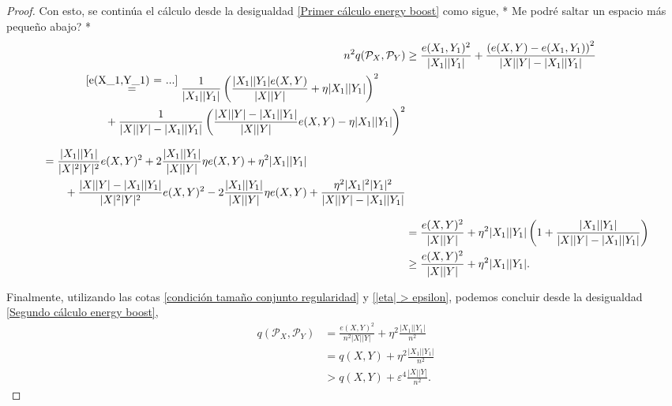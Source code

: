 \documentclass{article}[14pts]
\newcommand{\hh}[1]{{\color{red} * #1 *}}
\let\varepsilon=\varepsilon
\begin{document}
\begin{proof}
    Con esto, se continúa el cálculo desde la desigualdad \eqref{Primer cálculo energy boost} como sigue, \hh{Me podré saltar un espacio más pequeño abajo?}
    \begin{align} \label{Segundo cálculo energy boost}
        n^{2}q(\mathcal{P}_{X}, \mathcal{P}_{Y}) &\geq \frac{e(X_1, Y_1)^{2}}{|X_1||Y_1|} + \frac{\left( e(X,Y) - e(X_1, Y_1)\right)^{2}}{|X||Y| - |X_1||Y_1|}\nonumber\\
        \begin{split}
            &\overset{\eqref{e(X_1,Y_1) = ...}}{=} \frac{1}{|X_1||Y_1|}\left( \frac{|X_1||Y_1|e(X,Y)}{|X||Y|} + \eta |X_1||Y_1|\right)^{2} \\
            &\qquad + \frac{1}{|X||Y| - |X_1||Y_1|}\left( \frac{|X||Y| - |X_1||Y_1|}{|X||Y|}e(X,Y) - \eta |X_1||Y_1|\right)^{2}    
        \end{split}\nonumber\\
        \intertext{}
        \begin{split}
            &= \frac{|X_1||Y_1|}{|X|^{2}|Y|^{2}}e(X,Y)^{2} + 2\frac{|X_1||Y_1|}{|X||Y|}\eta e(X,Y) + \eta^{2}|X_1||Y_1| \\
            &\qquad + \frac{|X||Y| - |X_1||Y_1|}{|X|^{2}|Y|^{2}}e(X,Y)^{2} - 2\frac{|X_1||Y_1|}{|X||Y|}\eta e(X,Y) + \frac{\eta^{2} |X_1|^{2}|Y_1|^{2}}{|X||Y| - |X_1||Y_1|}    
        \end{split}\nonumber\\
        \intertext{ }
        &= \frac{e(X,Y)^{2}}{|X||Y|} + \eta^{2}|X_1||Y_1|\left( 1 + \frac{|X_1||Y_1|}{|X||Y| - |X_1||Y_1|}\right)\nonumber\\
        &\geq \frac{e(X,Y)^{2}}{|X||Y|} + \eta^{2}|X_1||Y_1|.
    \end{align}

    Finalmente, utilizando las cotas \eqref{condición tamaño conjunto regularidad} y \eqref{|eta| > epsilon}, podemos concluir desde la desigualdad \eqref{Segundo cálculo energy boost},
    \begin{align*}
        q(\mathcal{P}_{X}, \mathcal{P}_{Y}) &= \frac{e(X,Y)^{2}}{n^{2}|X||Y|} + \eta^{2}\frac{|X_1||Y_1|}{n^{2}}\\
        &= q(X,Y) + \eta^{2}\frac{|X_1||Y_1|}{n^{2}}\\
        &> q(X,Y) + \varepsilon^{4}\frac{|X||Y|}{n^{2}}.
    \end{align*}
\end{proof}\medskip
\end{document}
